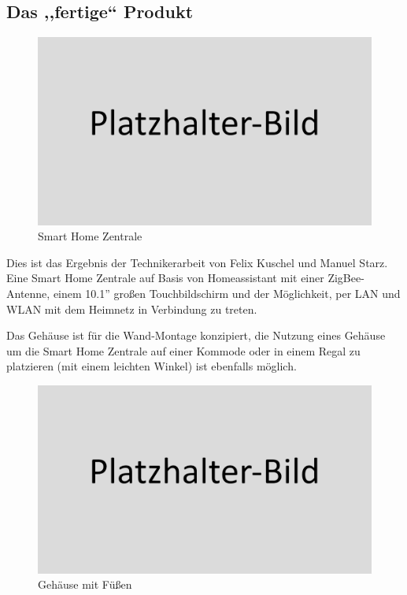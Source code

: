 \subsection{Das ,,fertige`` Produkt}
\begin{figure}[h!t]
	\includegraphics[width=1\textwidth]{img/placeholder.png}
	\caption[Smart Home Zentrale]{Smart Home Zentrale}
	\label{fig:smart-home-zentrale}
\end{figure}
Dies ist das Ergebnis der Technikerarbeit von Felix Kuschel und Manuel Starz. Eine Smart Home Zentrale auf Basis von Homeassistant mit einer ZigBee-Antenne, einem 10.1'' großen Touchbildschirm und der Möglichkeit, per LAN und WLAN mit dem Heimnetz in Verbindung zu treten.\par
Das Gehäuse ist für die Wand-Montage konzipiert, die Nutzung eines Gehäuse um die Smart Home Zentrale auf einer Kommode oder in einem Regal zu platzieren (mit einem leichten Winkel) ist ebenfalls möglich.
\begin{figure}[h!tb]
	\includegraphics[width=1\textwidth]{img/placeholder.png}
	\caption[Gehäuse mit Füßen]{Gehäuse mit Füßen}
	\label{fig:case-with-feet}
\end{figure}